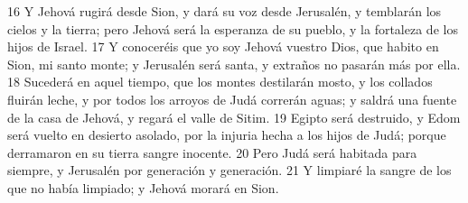 16 Y Jehová rugirá desde Sion, y dará su voz desde Jerusalén, y temblarán los cielos y la tierra; pero Jehová será la esperanza de su pueblo, y la fortaleza de los hijos de Israel.
17 Y conoceréis que yo soy Jehová vuestro Dios, que habito en Sion, mi santo monte; y Jerusalén será santa, y extraños no pasarán más por ella.
18 Sucederá en aquel tiempo, que los montes destilarán mosto, y los collados fluirán leche, y por todos los arroyos de Judá correrán aguas; y saldrá una fuente de la casa de Jehová, y regará el valle de Sitim.
19 Egipto será destruido, y Edom será vuelto en desierto asolado, por la injuria hecha a los hijos de Judá; porque derramaron en su tierra sangre inocente.
20 Pero Judá será habitada para siempre, y Jerusalén por generación y generación.
21 Y limpiaré la sangre de los que no había limpiado; y Jehová morará en Sion.

